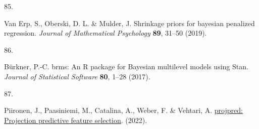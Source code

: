 \documentclass[
  man,floatsintext]{apa6}
\newlength{\cslhangindent}
\newlength{\csllabelwidth}
\newlength{\cslentryspacingunit} %
\newenvironment{CSLReferences}[2] %
 {%
  \setlength{\parindent}{0pt}
  \ifodd #1
  \let\oldpar\par
  \def\par{\hangindent=\cslhangindent\oldpar}
  \fi
  \setlength{\parskip}{#2\cslentryspacingunit}
 }%
 {}
\newcommand{\CSLLeftMargin}[1]{\parbox[t]{\csllabelwidth}{#1}}
\newcommand{\CSLRightInline}[1]{\parbox[t]{\linewidth - \csllabelwidth}{#1}\break}
\begin{document}
\begin{CSLReferences}{0}{0}
\leavevmode{}%
\CSLLeftMargin{85. }%
\CSLRightInline{Van Erp, S., Oberski, D. L. \& Mulder, J. Shrinkage priors for bayesian penalized regression. \emph{Journal of Mathematical Psychology} \textbf{89}, 31--50 (2019).}

\leavevmode{}%
\CSLLeftMargin{86. }%
\CSLRightInline{Bürkner, P.-C. {brms}: An {R} package for {Bayesian} multilevel models using {Stan}. \emph{Journal of Statistical Software} \textbf{80}, 1--28 (2017).}

\leavevmode{}%
\CSLLeftMargin{87. }%
\CSLRightInline{Piironen, J., Paasiniemi, M., Catalina, A., Weber, F. \& Vehtari, A. \href{https://mc-stan.org/projpred/}{{projpred}: Projection predictive feature selection}. (2022).}

\end{CSLReferences}

\endgroup

\newpage
\end{document}
